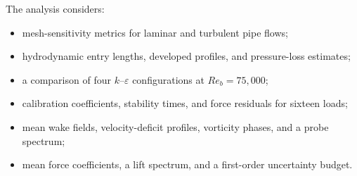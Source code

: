 The analysis considers:
\begin{itemize}
    \item mesh-sensitivity metrics for laminar and turbulent pipe flows;
    \item hydrodynamic entry lengths, developed profiles, and pressure-loss estimates;
    \item a comparison of four $k$--$\varepsilon$ configurations at $Re_b=75{,}000$;
    \item calibration coefficients, stability times, and force residuals for sixteen loads;
    \item mean wake fields, velocity-deficit profiles, vorticity phases, and a probe spectrum;
    \item mean force coefficients, a lift spectrum, and a first-order uncertainty budget.
\end{itemize}
